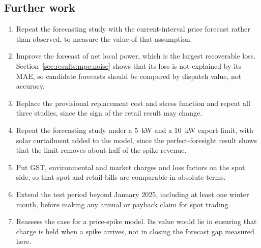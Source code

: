 \subsection{Further work}
\label{sec:results:further}

\begin{enumerate}
    \item Repeat the forecasting study with the current-interval price forecast rather
    than observed, to measure the value of that assumption.
    \item Improve the forecast of net local power, which is the largest recoverable
    loss. Section~\ref{sec:results:mpc:noise} shows that its loss is not explained by its
    MAE, so candidate forecasts should be compared by dispatch value, not accuracy.
    \item Replace the provisional replacement cost and stress function and repeat all
    three studies, since the sign of the retail result may change.
    \item Repeat the forecasting study under a 5~kW and a 10~kW export limit, with solar
    curtailment added to the model, since the perfect-foresight result shows that the
    limit removes about half of the spike revenue.
    \item Put GST, environmental and market charges and loss factors on the spot side, so
    that spot and retail bills are comparable in absolute terms.
    \item Extend the test period beyond January 2025, including at least one winter
    month, before making any annual or payback claim for spot trading.
    \item Reassess the case for a price-spike model. Its value would lie in ensuring that
    charge is held when a spike arrives, not in closing the forecast gap measured here.
\end{enumerate}
